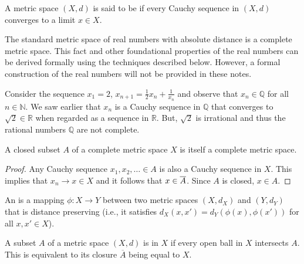 \begin{definition}
A metric space $(X,d)$ is said to be  if every Cauchy sequence in $(X,d)$ converges to a limit $x \in X$.
\end{definition}

The standard metric space of real numbers with absolute distance is a complete metric space.
This fact and other foundational properties of the real numbers can be derived formally using the techniques described below.
However, a formal construction of the real numbers will not be provided in these notes.


\begin{example}
Consider the sequence $x_1 = 2$, $x_{n+1} = \frac{1}{2}x_n + \frac{1}{x_n}$ and observe that $x_n \in \mathbb{Q}$ for all $n\in \mathbb{N}$.
We saw earlier that $x_n$ is a Cauchy sequence in $\mathbb{Q}$ that converges to $\sqrt{2} \in \mathbb{R}$ when regarded as a sequence in $\mathbb{R}$.
But, $\sqrt{2}$ is irrational and thus the rational numbers $\mathbb{Q}$ are not complete.
\end{example}

\begin{theorem}
A closed subset $A$ of a complete metric space $X$ is itself a complete metric space.
\end{theorem}
\begin{proof}
Any Cauchy sequence $x_1,x_2,\ldots \in A$ is also a Cauchy sequence in $X$.
This implies that $x_n \to x \in X$ and it follows that $x \in \overline{A}$.
Since $A$ is closed, $x\in A$.
\end{proof}

\begin{definition}
An  is a mapping $\phi  \colon X \rightarrow Y$ between two metric spaces $(X,d_X)$ and $(Y,d_Y)$ that is distance preserving (i.e., it satisfies $d_X (x,x') = d_Y \left(\phi(x),\phi(x')\right)$ for all $x,x'\in X$).
\end{definition}

\begin{definition}
A subset $A$ of a metric space $(X,d)$ is  in $X$ if every open ball in $X$ intersects $A$.
This is equivalent to its closure $\overline{A}$ being equal to $X$.
\end{definition}

